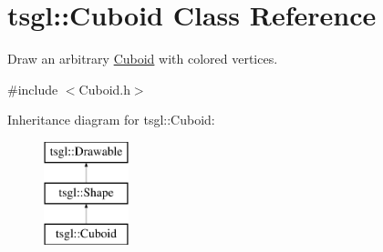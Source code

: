 \hypertarget{classtsgl_1_1_cuboid}{}\section{tsgl\+:\+:Cuboid Class Reference}
\label{classtsgl_1_1_cuboid}


Draw an arbitrary \hyperlink{classtsgl_1_1_cuboid}{Cuboid} with colored vertices.  




{\ttfamily \#include $<$Cuboid.\+h$>$}

Inheritance diagram for tsgl\+:\+:Cuboid\+:\begin{figure}[H]
\begin{center}
\leavevmode
\includegraphics[height=3.000000cm]{classtsgl_1_1_cuboid}
\end{center}
\end{figure}
